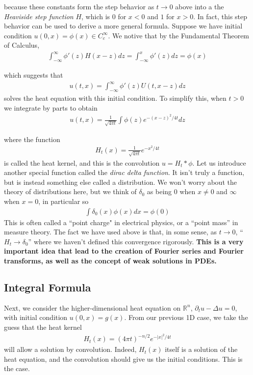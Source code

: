 \documentclass{article}
\newcommand{\R}{{\mathbb{R}}}
\newcommand{\pd}{\partial}
\begin{document}
	because these constants form the step behavior as $t\to0$ above into a the \textit{Heaviside step function} $H$, which is $0$ for $x<0$ and $1$ for $x>0$. In fact, this step behavior can be used to derive a more general formula. Suppose we have initial condition $u(0,x) = \phi(x) \in C_{c}^{\infty}$. We notive that by the Fundamental Theorem of Calculus,
	\begin{align*}
		\int_{-\infty}^{\infty} \phi'(z)H(x-z) dz = \int_{-\infty}^{x} \phi'(z) dz = \phi(x)
	\end{align*}
	
	which suggests that 
	\begin{align*}
		u(t,x) = \int_{-\infty}^{\infty} \phi'(z) U(t,x-z)dz
	\end{align*}
	solves the heat equation with this initial condition. To simplify this, when $t>0$ we integrate by parts to obtain
	\begin{align*}
		u(t,x) = \frac{1}{\sqrt{4\pi t}} \int \phi(z) e^{-(x-z)^{2}/4t }dz
	\end{align*}
	
	where the function 
	\begin{align*}
		H_{t}(x) = \frac{1}{\sqrt{4\pi t}} e^{-x^{2}/4t}
	\end{align*}
	is called the heat kernel, and this is the convolution $u = H_{t} * \phi$. Let us introduce another special function called the \textit{dirac delta function}. It isn't truly a function, but is instead something else called a distribution. We won't worry about the theory of distributions here, but we think of $\delta_{0}$ as being $0$ when $x \neq 0$ and $\infty$ when $x=0$, in particular so 
	\begin{align*}
		\int \delta_{0}(x) \phi(x) dx = \phi(0)
	\end{align*}
	This is often called a ``point charge" in electrical physics, or a ``point mass'' in measure theory. The fact we have used above is that, in some sense, as $t \to 0$, ``$H_{t} \to \delta_{0}$'' where we haven't defined this convergence rigorously. \textbf{This is a very important idea that lead to the creation of Fourier series and Fourier transforms, as well as the concept of weak solutions in PDEs.} 
	
	\subsection{Integral Formula}
	
	Next, we consider the higher-dimensional heat equation on $\R^{n}$, $\pd_{t}u - \Delta u = 0$, with initial condition $u(0,x) = g(x)$. From our previous 1D case, we take the guess that the heat kernel 
	\begin{align*}
		H_{t}(x) = (4\pi t)^{-n/2} e^{-|x|^{2}/4t}
	\end{align*}
	will allow a solution by convolution. Indeed, $H_{t}(x)$ itself is a solution of the heat equation, and the convolution should give us the initial conditions. This is the case. 
	
\end{document}
